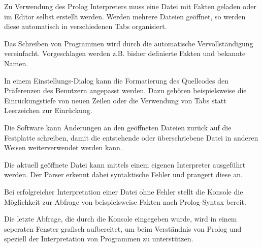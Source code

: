 \documentclass[parskip=full,11pt,twoside]{scrartcl}
\begin{document}
Zu Verwendung des Prolog Interpreters muss eine Datei mit Fakten geladen oder im Editor selbst erstellt werden. Werden mehrere Dateien geöffnet, so werden diese automatisch in verschiedenen Tabs organisiert.


Das Schreiben von Programmen wird durch die automatische Vervollständigung vereinfacht. Vorgeschlagen werden z.B. bisher definierte Fakten und bekannte Namen.


In einem Einstellungs-Dialog kann die Formatierung des Quellcodes den Präferenzen des Benutzern angepasst werden. Dazu gehören beispielsweise die Einrückungstiefe von neuen Zeilen oder die Verwendung von Tabs statt Leerzeichen zur Einrückung.


Die Software kann Änderungen an den geöffneten Dateien zurück auf die Festplatte schreiben, damit die entstehende oder überschriebene Datei in anderen Weisen weiterverwendet werden kann.


Die aktuell geöffnete Datei kann mittels einem eigenen Interpreter ausgeführt werden. Der Parser erkennt dabei syntaktische Fehler und prangert diese an.


Bei erfolgreicher Interpretation einer Datei ohne Fehler stellt die Konsole die Möglichkeit zur Abfrage von beispielsweise Fakten nach Prolog-Syntax bereit.


Die letzte Abfrage, die durch die Konsole eingegeben wurde, wird in einem seperaten Fenster grafisch aufbereitet, um beim Verständnis von Prolog und speziell der Interpretation von Programmen zu unterstützen.

\end{document}
